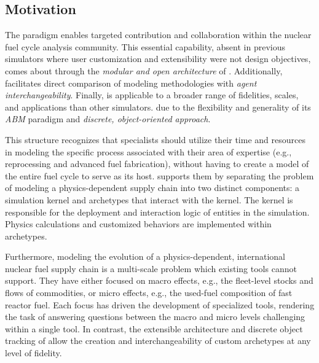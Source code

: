 

\subsection{Motivation}

The \Cyclus paradigm enables targeted contribution and collaboration within the
nuclear fuel cycle analysis community. This essential capability, absent in
previous simulators where user customization and extensibility were not design
objectives, comes about through the \emph{modular and open architecture} of
\Cyclus.  Additionally, \Cyclus facilitates direct comparison of modeling
methodologies with \emph{agent interchangeability}.  Finally, \Cyclus is
applicable to a broader range of fidelities, scales, and applications than
other simulators.  due to the flexibility and generality of its
\emph{\gls{ABM}} paradigm and \emph{discrete, object-oriented approach}.

This structure recognizes that specialists should utilize their time and
resources in modeling the specific process associated with their area of
expertise (e.g., reprocessing and advanced fuel fabrication), without having to
create a model of the entire fuel cycle to serve as its host.  \Cyclus supports
them by separating the problem of modeling a physics-dependent supply chain
into two distinct components: a simulation kernel and archetypes that interact
with the kernel. The kernel is responsible for the deployment and interaction
logic of entities in the simulation.  Physics calculations and customized
behaviors are implemented within archetypes.

Furthermore, modeling the evolution of a physics-dependent, international
nuclear fuel supply chain is a multi-scale problem which existing tools cannot
support. They have either focused on macro effects, e.g., the fleet-level
stocks and flows of commodities, or micro effects, e.g., the used-fuel
composition of fast reactor fuel. Each focus has driven the development of
specialized tools, rendering the task of answering questions between the macro
and micro levels challenging within a single tool.  In contrast, the extensible
architecture and discrete object tracking of \Cyclus allow the creation and
interchangeability of custom archetypes at any level of fidelity.

